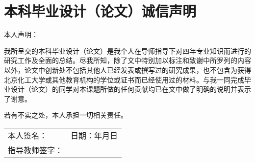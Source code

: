\chapter*{本科毕业设计（论文）诚信声明}
	\noindent 本人声明：\par
	我所呈交的本科毕业设计（论文）是我个人在导师指导下对四年专业知识而进行的研究工作及全面的总结。尽我所知，除了文中特别加以标注和致谢中所罗列的内容以外，论文中创新处不包括其他人已经发表或撰写过的研究成果，也不包含为获得北京化工大学或其他教育机构的学位或证书而已经使用过的材料。与我一同完成毕业设计（论文）的同学对本课题所做的任何贡献均已在文中做了明确的说明并表示了谢意。\par
	若有不实之处，本人承担一切相关责任。\par

\vspace{3\baselineskip}

\renewcommand\arraystretch{2}
\begin{center}
	\begin{tabularx}{\linewidth}{XX}
		本人签名：\underline{\hspace{8em}} & 日期：\underline{\hspace{4em}}年\underline{\hspace{2em}}月\underline{\hspace{2em}}日	\\
		指导教师签字：\underline{\hspace{6em}}	\\
	\end{tabularx}
\end{center}
\renewcommand\arraystretch{1.2}
